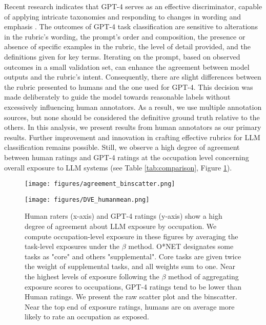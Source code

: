 \documentclass[11pt]{article}
\begin{document}
Recent research indicates that GPT-4 serves as an effective discriminator, capable of applying intricate taxonomies and responding to changes in wording and emphasis \citep{gpt4}. The outcomes of GPT-4 task classification are sensitive to alterations in the rubric's wording, the prompt's order and composition, the presence or absence of specific examples in the rubric, the level of detail provided, and the definitions given for key terms. Iterating on the prompt, based on observed outcomes in a small validation set, can enhance the agreement between model outputs and the rubric's intent. Consequently, there are slight differences between the rubric presented to humans and the one used for GPT-4. This decision was made deliberately to guide the model towards reasonable labels without excessively influencing human annotators. As a result, we use multiple annotation sources, but none should be considered the definitive ground truth relative to the others. In this analysis, we present results from human annotators as our primary results. Further improvement and innovation in crafting effective rubrics for LLM classification remains possible. Still, we observe a high degree of agreement between human ratings and GPT-4 ratings at the occupation level concerning overall exposure to LLM systems (see Table \ref{tab:comparison}, Figure \ref{two_agreement_figs}).
\begin{figure}
    \centering
    \begin{minipage}{0.45\textwidth}
        \centering
        \texttt{[image: figures/agreement\_binscatter.png]}
    \end{minipage}\hfill
    \begin{minipage}{0.5\textwidth}
        \centering
        \texttt{[image: figures/DVE\_humanmean.png]}
    \end{minipage}
        \caption{Human raters (x-axis) and GPT-4 ratings (y-axis) show a high degree of agreement about LLM exposure by occupation. We compute occupation-level exposure in these figures by averaging the task-level exposures under the $\beta$ method. O*NET designates some tasks as "core" and others "supplemental". Core tasks are given twice the weight of supplemental tasks, and all weights sum to one. Near the highest levels of exposure following the $\beta$ method of aggregating exposure scores to occupations, GPT-4 ratings tend to be lower than Human ratings. We present the raw scatter plot and the binscatter. Near the top end of exposure ratings, humans are on average more likely to rate an occupation as exposed.}
        \label{fig:humangpt_exp_regscatter}
    \label{two_agreement_figs}    
\end{figure}
\end{document}
